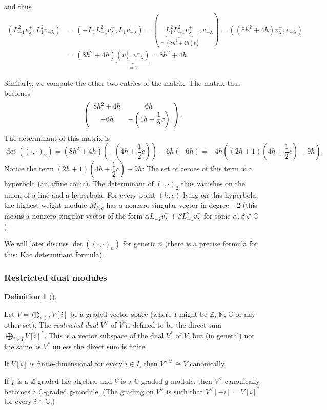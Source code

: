 \documentclass
[numbers=enddot,12pt,final,onecolumn,german,notitlepage]{scrartcl}%
\theoremstyle{definition}
\newtheorem{defi}[theo]{Definition}
\newenvironment{definition}[1][]
{\begin{defi}[#1]\begin{leftbar}}
{\end{leftbar}\end{defi}}
\begin{document}
and thus%
\begin{align*}
\left(  L_{-1}^{2}v_{\lambda}^{+},L_{1}^{2}v_{-\lambda}^{-}\right)   &
=\left(  -L_{1}L_{-1}^{2}v_{\lambda}^{+},L_{1}v_{-\lambda}^{-}\right)
=\left(  \underbrace{L_{1}^{2}L_{-1}^{2}v_{\lambda}^{+}}_{=\left(
8h^{2}+4h\right)  v_{\lambda}^{+}},v_{-\lambda}^{-}\right)  =\left(  \left(
8h^{2}+4h\right)  v_{\lambda}^{+},v_{-\lambda}^{-}\right) \\
&  =\left(  8h^{2}+4h\right)  \underbrace{\left(  v_{\lambda}^{+},v_{-\lambda
}^{-}\right)  }_{=1}=8h^{2}+4h.
\end{align*}


Similarly, we compute the other two entries of the matrix. The matrix thus
becomes%
\[
\left(
\begin{array}
[c]{cc}%
8h^{2}+4h & 6h\\
-6h & -\left(  4h+\dfrac{1}{2}c\right)
\end{array}
\right)  .
\]
The determinant of this matrix is%
\[
\det\left(  \left(  \cdot,\cdot\right)  _{2}\right)  =\left(  8h^{2}%
+4h\right)  \left(  -\left(  4h+\dfrac{1}{2}c\right)  \right)  -6h\left(
-6h\right)  =-4h\left(  \left(  2h+1\right)  \left(  4h+\dfrac{1}{2}c\right)
-9h\right)  .
\]
Notice the term $\left(  2h+1\right)  \left(  4h+\dfrac{1}{2}c\right)  -9h$:
The set of zeroes of this term is a hyperbola (an affine conic). The
determinant of $\left(  \cdot,\cdot\right)  _{2}$ thus vanishes on the union
of a line and a hyperbola. For every point $\left(  h,c\right)  $ lying on
this hyperbola, the highest-weight module $M_{h,c}^{+}$ has a nonzero singular
vector in degree $-2$ (this means a nonzero singular vector of the form
$\alpha L_{-2}v_{\lambda}^{+}+\beta L_{-1}^{2}v_{\lambda}^{+}$ for some
$\alpha,\beta\in\mathbb{C}$).

We will later discuss $\det\left(  \left(  \cdot,\cdot\right)  _{n}\right)  $
for generic $n$ (there is a precise formula for this: Kac determinant formula).

\subsubsection{Restricted dual modules}

\begin{definition}
Let $V=\bigoplus\limits_{i\in I}V\left[  i\right]  $ be a graded vector space
(where $I$ might be $\mathbb{Z}$, $\mathbb{N}$, $\mathbb{C}$ or any other
set). The \textit{restricted dual} $V^{\vee}$ of $V$ is defined to be the
direct sum $\bigoplus\limits_{i\in I}V\left[  i\right]  ^{\ast}$. This is a
vector subspace of the dual $V^{\ast}$ of $V$, but (in general) not the same
as $V^{\ast}$ unless the direct sum is finite.

If $V\left[  i\right]  $ is finite-dimensional for every $i\in I$, then
$V^{\vee\vee}\cong V$ canonically.

If $\mathfrak{g}$ is a $\mathbb{Z}$-graded Lie algebra, and $V$ is a
$\mathbb{C}$-graded $\mathfrak{g}$-module, then $V^{\vee}$ canonically becomes
a $\mathbb{C}$-graded $\mathfrak{g}$-module. (The grading on $V^{\vee}$ is
such that $V^{\vee}\left[  -i\right]  =V\left[  i\right]  ^{\ast}$ for every
$i\in\mathbb{C}$.)
\end{definition}
\end{document}
